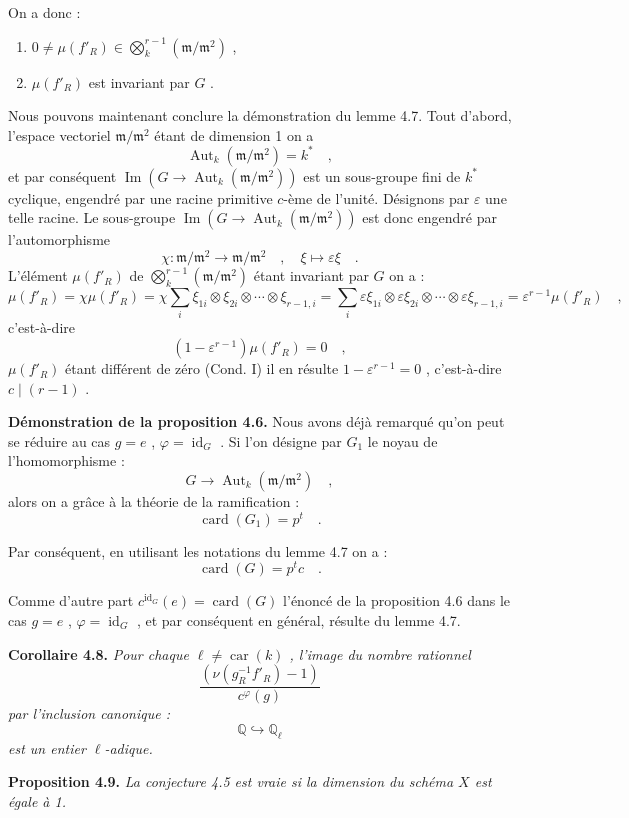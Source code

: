 \documentclass[11pt]{article}
\providecommand{\fm}{\mathfrak{m}}
\newcommand{\car}{\operatorname{car}}
\providecommand{\car}{\operatorname{car}}
\providecommand{\id}{\operatorname{id}}
\providecommand{\id}{\operatorname{id}}
\providecommand{\id}{\operatorname{id}}
\providecommand{\Aut}{\operatorname{Aut}}
\providecommand{\car}{\operatorname{car}}
\providecommand{\id}{\operatorname{id}}
\providecommand{\id}{\operatorname{id}}
\providecommand{\im}{\operatorname{Im}}
\providecommand{\bQ}{\mathbb Q}
\providecommand{\fm}{\mathfrak m}
\providecommand{\card}{\operatorname{card}}
\providecommand{\im}{\operatorname{im}}
\providecommand{\Aut}{\operatorname{Aut}}
\providecommand{\car}{\operatorname{car}}
\providecommand{\id}{\operatorname{id}}
\begin{document}
On a donc :
\begin{enumerate}
\item[I)] $0 \neq \mu(f'_R) \in \bigotimes_k^{r-1}(\fm/\fm^2)$ ,
\item[II)] $\mu(f'_R)$ est invariant par $G$ .
\end{enumerate}

Nous pouvons maintenant conclure la démonstration du lemme 4.7. Tout d'abord, l'espace vectoriel $\fm/\fm^2$ étant de dimension 1 on a
\[
\Aut_k(\fm/\fm^2) = k^* \quad ,
\]
et par conséquent $\im(G \longrightarrow \Aut_k(\fm/\fm^2))$ est un sous-groupe fini de $k^*$ cyclique, engendré par une racine primitive $c$-ème de l'unité. Désignons par $\varepsilon$ une telle racine. Le sous-groupe $\im(G \longrightarrow \Aut_k(\fm/\fm^2))$ est donc engendré par l'automorphisme
\[
\chi : \fm/\fm^2 \longrightarrow \fm/\fm^2 \quad , \quad \xi \longmapsto \varepsilon\xi \quad .
\]
L'élément $\mu(f'_R)$ de $\bigotimes_k^{r-1}(\fm/\fm^2)$ étant invariant par $G$ on a :
\[
\mu(f'_R) = \chi\mu(f'_R) = \chi\sum_i \xi_{1i} \otimes \xi_{2i} \otimes \cdots \otimes \xi_{r-1,i} = \sum_i \varepsilon\xi_{1i} \otimes \varepsilon\xi_{2i} \otimes \cdots \otimes \varepsilon\xi_{r-1,i} = \varepsilon^{r-1}\mu(f'_R) \quad ,
\]
c'est-à-dire
\[
(1 - \varepsilon^{r-1})\mu(f'_R) = 0 \quad ,
\]
$\mu(f'_R)$ étant différent de zéro (Cond. I) il en résulte $1 - \varepsilon^{r-1} = 0$ , c'est-à-dire $c \mid (r-1)$ .

\medskip

\noindent
\textbf{Démonstration de la proposition 4.6.} Nous avons déjà remarqué qu'on peut se réduire au cas $g = e$ , $\varphi = \id_G$ . Si l'on désigne par $G_1$ le noyau de l'homomorphisme :
\[
G \longrightarrow \Aut_k(\fm/\fm^2) \quad ,
\]
alors on a grâce à la théorie de la ramification :
\[
\card(G_1) = p^t \quad .
\]

Par conséquent, en utilisant les notations du lemme 4.7 on a :
\[
\card(G) = p^t c \quad .
\]

Comme d'autre part $c^{\id_G}(e) = \card(G)$ l'énoncé de la proposition 4.6 dans le cas $g = e$ , $\varphi = \id_G$ , et par conséquent en général, résulte du lemme 4.7.

\medskip
\noindent
\textbf{Corollaire 4.8.} \emph{Pour chaque $\ell \neq \car(k)$ , l'image du nombre rationnel
\[
\frac{(\nu(g_R^{-1}f'_R) - 1)}{c^\varphi(g)}
\]
par l'inclusion canonique :
\[
\bQ \hookrightarrow \bQ_\ell
\]
est un entier $\ell$-adique.}

\medskip
\noindent
\textbf{Proposition 4.9.} \emph{La conjecture 4.5 est vraie si la dimension du schéma $X$ est égale à 1.}
\end{document}
